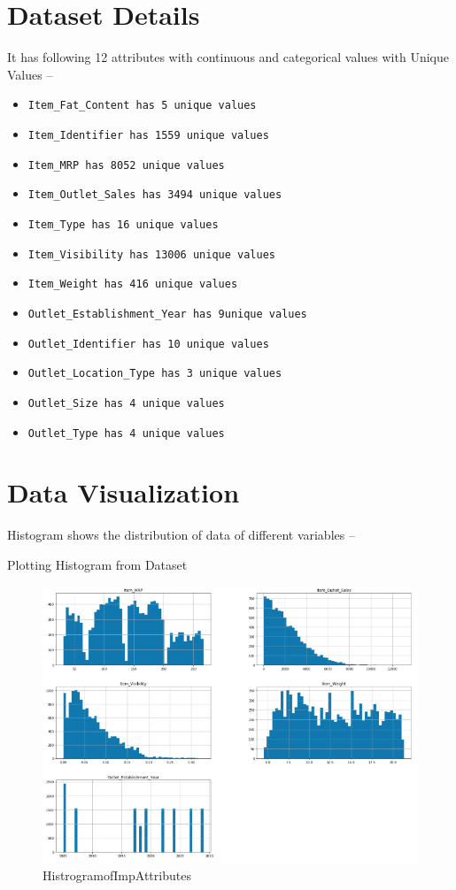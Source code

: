 \section{Dataset Details}
It has following 12 attributes with continuous and categorical values 
with Unique Values –
\begin{itemize}
\item \verb|Item_Fat_Content has 5 unique values|
\item \verb|Item_Identifier has 1559 unique values|
\item \verb|Item_MRP has 8052 unique values|
\item \verb|Item_Outlet_Sales has 3494 unique values|
\item \verb|Item_Type has 16 unique values|
\item \verb|Item_Visibility has 13006 unique values|
\item \verb|Item_Weight has 416 unique values|
\item \verb|Outlet_Establishment_Year has 9unique values|
\item \verb|Outlet_Identifier has 10 unique values|
\item \verb|Outlet_Location_Type has 3 unique values|
\item \verb|Outlet_Size has 4 unique values|
\item \verb|Outlet_Type has 4 unique values|
\end{itemize}


\section{Data Visualization}
Histogram shows the distribution of data of different variables –

Plotting Histogram from Dataset

\begin{figure}[pic1]
	\centering\includegraphics[width=\columnwidth]{Images/mlstudio/HistrogramofImpAttributes.png}
	\caption{HistrogramofImpAttributes}\label{fig:HistrogramofImpAttributes}
\end{figure}

